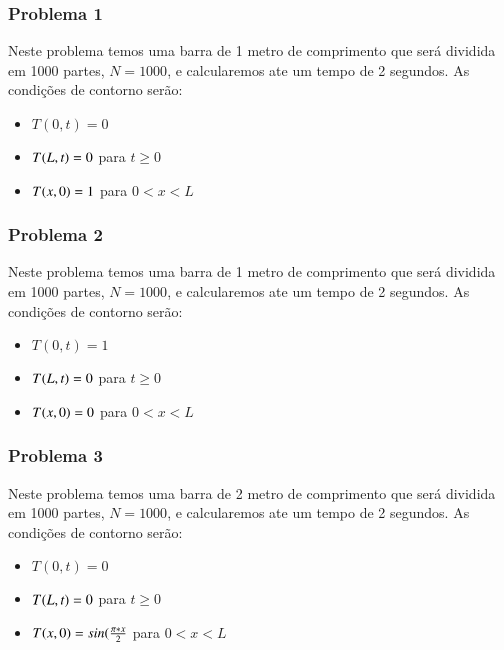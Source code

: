 \documentclass[final,5p,times,twocolumn]{elsarticle}
\begin{document}
\subsubsection{Problema 1}
\label{subsec:Problema 1}

Neste problema temos uma barra de 1 metro de comprimento que será dividida em 1000 partes, $N = 1000$, e calcularemos ate um tempo de 2 segundos. As condições de contorno serão:

\begin{itemize}
    \item $T(0,t) = 0$
    \item $T(L,t) = 0\\$
    para $t\ge 0$
    \item $T(x,0) = 1\\$
    para $0 < x < L$
\end{itemize}

\subsubsection{Problema 2}
\label{subsec:Problema 2}

Neste problema temos uma barra de 1 metro de comprimento que será dividida em 1000 partes, $N = 1000$, e calcularemos ate um tempo de 2 segundos. As condições de contorno serão:

\begin{itemize}
    \item $T(0,t) = 1$
    \item $T(L,t) = 0\\$
    para $t\ge 0$
    \item $T(x,0) = 0\\$
    para $0 < x < L$
\end{itemize}

\subsubsection{Problema 3}
\label{subsec:Problema 3}

Neste problema temos uma barra de 2 metro de comprimento que será dividida em 1000 partes, $N = 1000$, e calcularemos ate um tempo de 2 segundos. As condições de contorno serão:

\begin{itemize}
    \item $T(0,t) = 0$
    \item $T(L,t) = 0\\$
    para $t\ge 0$
    \item $T(x,0) = sin(\frac{\pi * x}{2}\\$
    para $0 < x < L$
\end{itemize}
\end{document}

